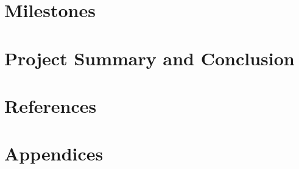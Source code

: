\documentclass[12pt]{article}
\begin{document}
\section{Milestones}
  
\newpage

\section{Project Summary and Conclusion}
  
\newpage

\section{References}
  
\newpage

\section{Appendices}
  
\end{document}
